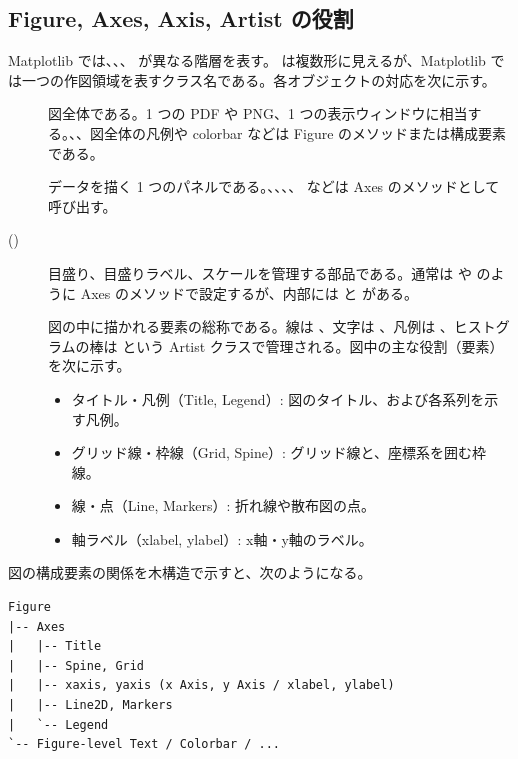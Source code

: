 \subsection{Figure, Axes, Axis, Artist の役割}

Matplotlib では、、、 が異なる階層を表す。 は複数形に見えるが、Matplotlib では一つの作図領域を表すクラス名である。各オブジェクトの対応を次に示す。

\begin{description}
\item[] 図全体である。1 つの PDF や PNG、1 つの表示ウィンドウに相当する。、、図全体の凡例や colorbar などは Figure のメソッドまたは構成要素である。
\item[] データを描く 1 つのパネルである。、、、、 などは Axes のメソッドとして呼び出す。
\item[ ()] 目盛り、目盛りラベル、スケールを管理する部品である。通常は  や  のように Axes のメソッドで設定するが、内部には  と  がある。
\item[] 図の中に描かれる要素の総称である。線は 、文字は 、凡例は 、ヒストグラムの棒は  という Artist クラスで管理される。図中の主な役割（要素）を次に示す。
  \begin{itemize}
    \item タイトル・凡例（Title, Legend）: 図のタイトル、および各系列を示す凡例。
    \item グリッド線・枠線（Grid, Spine）: グリッド線と、座標系を囲む枠線。
    \item 線・点（Line, Markers）: 折れ線や散布図の点。
    \item 軸ラベル（xlabel, ylabel）: x軸・y軸のラベル。
  \end{itemize}
\end{description}

図の構成要素の関係を木構造で示すと、次のようになる。

\begin{lstlisting}[numbers=none, xleftmargin=2\zw]
Figure
|-- Axes
|   |-- Title
|   |-- Spine, Grid
|   |-- xaxis, yaxis (x Axis, y Axis / xlabel, ylabel)
|   |-- Line2D, Markers
|   `-- Legend
`-- Figure-level Text / Colorbar / ...
\end{lstlisting}

